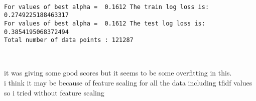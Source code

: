 \documentclass[11pt]{article}
\begin{document}
    \begin{center}
    \end{center}
    { \hspace*{\fill} \\}
    
    \begin{Verbatim}[commandchars=\\\{\}]
For values of best alpha =  0.1612 The train log loss is: 0.2749225188463317
For values of best alpha =  0.1612 The test log loss is: 0.3854195068372494
Total number of data points : 121287

    \end{Verbatim}

    \begin{center}
    \end{center}
    { \hspace*{\fill} \\}
    
    it was giving some good scores but it seems to be some overfitting in
this.\\
i think it may be because of feature scaling for all the data including
tfidf values so i tried without feature scaling
\end{document}
